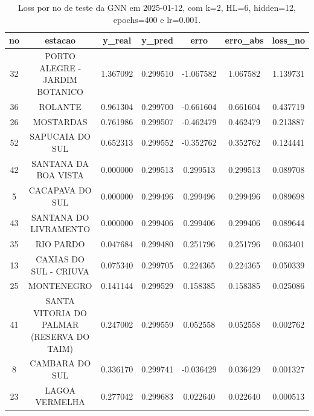 \begin{table}[h]
\centering
\caption{Loss por no de teste da GNN em 2025-01-12, com k=2, HL=6, hidden=12, epochs=400 e lr=0.001.}
\label{tab:gnn_loss_k2_hl6_h12_e400_d20250112}
\begin{tabular}{ccccccc}
\toprule
no & estacao & y\_real & y\_pred & erro & erro\_abs & loss\_no \\
\midrule
32 & PORTO ALEGRE - JARDIM BOTANICO & 1.367092 & 0.299510 & -1.067582 & 1.067582 & 1.139731 \\
36 & ROLANTE & 0.961304 & 0.299700 & -0.661604 & 0.661604 & 0.437719 \\
26 & MOSTARDAS & 0.761986 & 0.299507 & -0.462479 & 0.462479 & 0.213887 \\
52 & SAPUCAIA DO SUL & 0.652313 & 0.299552 & -0.352762 & 0.352762 & 0.124441 \\
42 & SANTANA DA BOA VISTA & 0.000000 & 0.299513 & 0.299513 & 0.299513 & 0.089708 \\
5 & CACAPAVA DO SUL & 0.000000 & 0.299496 & 0.299496 & 0.299496 & 0.089698 \\
43 & SANTANA DO LIVRAMENTO & 0.000000 & 0.299406 & 0.299406 & 0.299406 & 0.089644 \\
35 & RIO PARDO & 0.047684 & 0.299480 & 0.251796 & 0.251796 & 0.063401 \\
13 & CAXIAS DO SUL - CRIUVA & 0.075340 & 0.299705 & 0.224365 & 0.224365 & 0.050339 \\
25 & MONTENEGRO & 0.141144 & 0.299529 & 0.158385 & 0.158385 & 0.025086 \\
41 & SANTA VITORIA DO PALMAR (RESERVA DO TAIM) & 0.247002 & 0.299559 & 0.052558 & 0.052558 & 0.002762 \\
8 & CAMBARA DO SUL & 0.336170 & 0.299741 & -0.036429 & 0.036429 & 0.001327 \\
23 & LAGOA VERMELHA & 0.277042 & 0.299683 & 0.022640 & 0.022640 & 0.000513 \\
\bottomrule
\end{tabular}
\end{table}

